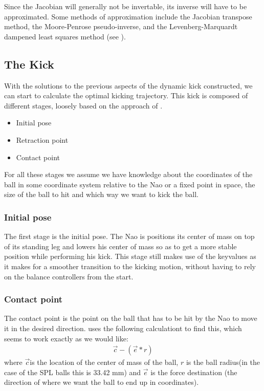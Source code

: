 \documentclass[a4paper]{article}
\begin{document}
Since the Jacobian will generally not be invertable, its inverse will
have to be approximated. Some methods of approximation include the
Jacobian transpose method, the Moore-Penrose pseudo-inverse, and the
Levenberg-Marquardt dampened least squares method (see \cite{Buss2009}).

\subsection{The Kick}
With the solutions to the previous aspects of the dynamic kick constructed, 
we can start to calculate the optimal kicking trajectory. This kick is composed
of different stages, loosely based on the approach of \cite{Xu2010}. 
\begin{itemize}
    \item Initial pose
    \item Retraction point
    \item Contact point
\end{itemize}

For all these stages we assume we have knowledge about the coordinates of the
ball in some coordinate system relative to the Nao or a fixed point in space,
the size of the ball to hit and which way we want to kick the ball.

\subsubsection{Initial pose}
The first stage is the initial pose. The Nao is positions its center of mass on
top of its standing leg and lowers his center of mass so as to get a more stable
position while performing his kick. This stage still makes use of the  keyvalues as 
it makes for a smoother transition to the kicking motion, without having to rely on 
the balance controllers from the start. 

\subsubsection{Contact point}
The contact point is the point on the ball that has to be hit by the Nao to
move it in the desired direction. \cite{Xu2010} uses the following
calculationt to find this, which seems to work exactly as we would like:
\begin{align*}
    \vec{c} - ( \vec{e} * r )
\end{align*}
where $\vec{c}$is the location of the center of mass of the ball, $r$ is the
ball radius(in the case of the SPL balls this is 33.42 mm) and $\vec{e}$ is the
force destination (the direction of where we want the ball to end up in
coordinates).
\end{document}
